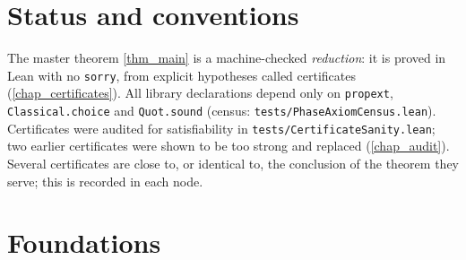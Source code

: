 %
%

\chapter{Status and conventions}

The master theorem \cref{thm_main} is a machine-checked \emph{reduction}: it is proved in Lean with
no \texttt{sorry}, from explicit hypotheses called certificates (\cref{chap_certificates}).
All library declarations depend only on \texttt{propext}, \texttt{Classical.choice} and
\texttt{Quot.sound} (census: \texttt{tests/PhaseAxiomCensus.lean}). Certificates were audited for
satisfiability in \texttt{tests/CertificateSanity.lean}; two earlier certificates were shown to be
too strong and replaced (\cref{chap_audit}). Several certificates are close to, or identical to,
the conclusion of the theorem they serve; this is recorded in each node.

\chapter{Foundations}

